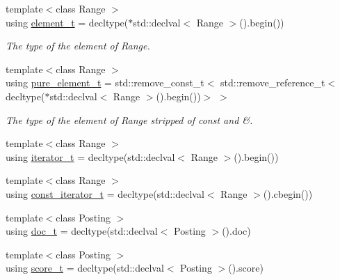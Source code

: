 \begin{DoxyCompactItemize}
{\footnotesize template$<$class Range $>$ }\\using \mbox{\hyperlink{namespaceirk_a44ec708d671914dae1d40355ac05c280}{element\+\_\+t}} = decltype($\ast$std\+::declval$<$ Range $>$().begin())
\begin{DoxyCompactList}\small\item\em The type of the element of Range. \end{DoxyCompactList}\item 
{\footnotesize template$<$class Range $>$ }\\using \mbox{\hyperlink{namespaceirk_a1e48b43a3f40d553264380da5e7263c1}{pure\+\_\+element\+\_\+t}} = std\+::remove\+\_\+const\+\_\+t$<$ std\+::remove\+\_\+reference\+\_\+t$<$ decltype($\ast$std\+::declval$<$ Range $>$().begin())$>$ $>$
\begin{DoxyCompactList}\small\item\em The type of the element of Range stripped of {\ttfamily const} and {\ttfamily \&}. \end{DoxyCompactList}\item 
{\footnotesize template$<$class Range $>$ }\\using \mbox{\hyperlink{namespaceirk_a333e3104afd57c79fb0c18b90081520a}{iterator\+\_\+t}} = decltype(std\+::declval$<$ Range $>$().begin())
\item 
{\footnotesize template$<$class Range $>$ }\\using \mbox{\hyperlink{namespaceirk_a90f7893fdbf95c6dcc2302148eb0bddb}{const\+\_\+iterator\+\_\+t}} = decltype(std\+::declval$<$ Range $>$().cbegin())
\item 
{\footnotesize template$<$class Posting $>$ }\\using \mbox{\hyperlink{namespaceirk_af5d95ec091f3bd711790e71ccb533903}{doc\+\_\+t}} = decltype(std\+::declval$<$ Posting $>$().doc)
\item 
{\footnotesize template$<$class Posting $>$ }\\using \mbox{\hyperlink{namespaceirk_a87bce44d1e3fdff0b1b3bb78f2a5f924}{score\+\_\+t}} = decltype(std\+::declval$<$ Posting $>$().score)
\end{DoxyCompactItemize}
